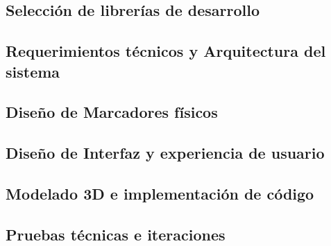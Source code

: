 \subsection{Selección de librerías de desarrollo}
\subsection{Requerimientos técnicos y Arquitectura del sistema}
\subsection{Diseño de Marcadores físicos}
\subsection{Diseño de Interfaz y experiencia de usuario}
\subsection{Modelado 3D e implementación de código}
\subsection{Pruebas técnicas e iteraciones}